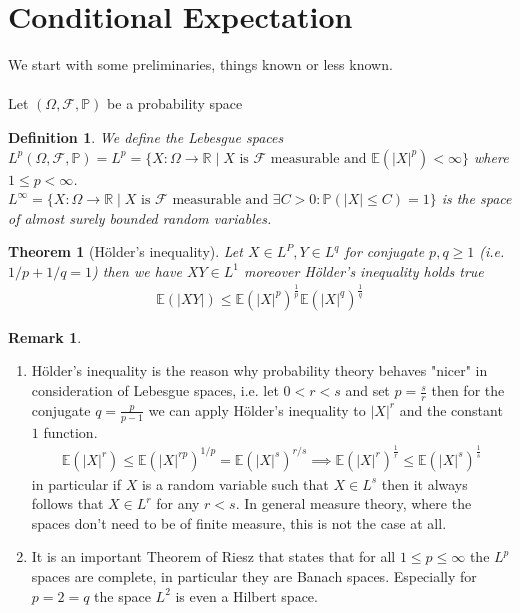 \documentclass[11pt,a4paper, final]{article}
\newtheorem{thm}{Theorem}[section]
\newtheorem{defn}{Definition}[section]
\theoremstyle{definition}
\newtheorem{rem}{Remark}[section]
\begin{document}
\thispagestyle{empty}
\tableofcontents
\newpage
\section{Conditional Expectation}
We start with some preliminaries, things known or less known.
\\\\
Let $( \Omega, \mathcal{F}, \mathbb{P})$ be a probability space
\begin{defn} We define the Lebesgue spaces \\ $L^p(\Omega, \mathcal{F}, \mathbb{P})=L^p= \lbrace X: \Omega \to \mathbb{R} \mid X \text{ is $\mathcal{F}$  measurable and } \mathbb{E}(|X|^p) < \infty \rbrace$ where $1 \leq p < \infty$. \\
$L^\infty = \lbrace X : \Omega \to \mathbb{R} \mid X \text{ is $\mathcal{F}$ measurable and } \exists C>0 : \mathbb{P}(|X| \leq C) = 1  \rbrace  $ is the space of almost surely bounded random variables. 
\end{defn}
\begin{thm}[Hölder's inequality] Let $X \in L^P, Y \in L^q$ for conjugate $p,q \geq 1$ (i.e. $1/p + 1/q = 1$) then we have $XY \in L^1$ moreover Hölder's inequality holds true
\begin{align*}
\mathbb{E}(|XY|) \leq \mathbb{E}(|X|^p)^{\frac{1}{p}} \mathbb{E}(|X|^q)^{\frac{1}{q}}
\end{align*}
\end{thm}
\begin{rem} \ \begin{enumerate}
\item Hölder's inequality is the reason why probability theory behaves "nicer" in consideration of Lebesgue spaces, i.e. let $0<r<s$ and set $p= \frac{s}{r}$ then for the conjugate $q=\frac{p}{p-1}$ we can apply Hölder's inequality to $|X|^r$ and the constant $1$ function. 
\begin{align*}
\mathbb{E}(|X|^r) \leq \mathbb{E}(|X|^{rp})^{1/p} = \mathbb{E}(|X|^s)^{r/s} \implies \mathbb{E}(|X|^r)^{\frac{1}{r}} \leq \mathbb{E}(|X|^s)^{\frac{1}{s}} 
\end{align*}
in particular if $X$ is a random variable such that $X \in L^s$ then it always follows that $X \in L^r$ for any $r <s$. In general measure theory, where the spaces don't need to be of finite measure, this is not the case at all. 
\item It is an important Theorem of Riesz that states that for all $1 \leq p \leq \infty$ the $L^p$ spaces are complete, in particular they are Banach spaces. Especially for $p=2=q$ the space $L^2$ is even a Hilbert space. 
\end{enumerate}
\end{rem}
\end{document}
